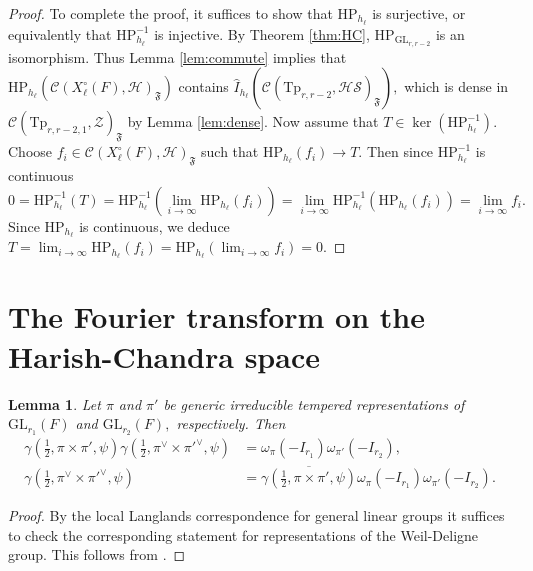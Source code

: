 \documentclass[12pt]{amsart}
\newtheorem{lem}[thm]{Lemma}
\theoremstyle{remark}
\numberwithin{equation}{section}
\newcommand{\GL}{\mathrm{GL}}
\theoremstyle{definition}
\numberwithin{equation}{subsection}
\begin{document}
\begin{proof}
To complete the proof, it suffices to show that $\mathrm{HP}_{h_\ell}$ is surjective, or equivalently that $\mathrm{HP}_{h_\ell}^{-1}$ is injective.  
By Theorem \ref{thm:HC}, $\mathrm{HP}_{\GL_{r,r-2}}$ is an isomorphism.  Thus Lemma \ref{lem:commute} implies that
$\mathrm{HP}_{h_\ell}(\mathcal{C}(X_{\ell}^\circ(F),\mathcal{H})_{\mathfrak{F}})$ contains $\widehat{I}_{h_\ell}(\mathcal{C}(\mathrm{Tp}_{r,r-2},\mathcal{HS})_{\mathfrak{F}}),$ which is dense in $\mathcal{C}(\mathrm{Tp}_{r,r-2,1},\mathcal{Z})_{\mathfrak{F}}$ by Lemma \ref{lem:dense}.
Now assume that $T \in \ker (\mathrm{HP}_{h_\ell}^{-1}).$
 Choose $f_i \in \mathcal{C}(X_{\ell}^\circ(F),\mathcal{H})_{\mathfrak{F}}$ such that $\mathrm{HP}_{h_\ell}(f_i) \to T.$  Then since $\mathrm{HP}_{h_\ell}^{-1}$ is continuous
 $$
 0=\mathrm{HP}_{h_\ell}^{-1}(T)= \mathrm{HP}_{h_\ell}^{-1} (\lim_{i\to\infty} \mathrm{HP}_{h_\ell}(f_i))=\lim_{i\to\infty} \mathrm{HP}_{h_\ell}^{-1} ( \mathrm{HP}_{h_\ell}(f_i))=\lim_{i\to\infty} f_i.
 $$
 Since $\mathrm{HP}_{h_\ell}$ is continuous, we deduce $T=\lim_{i\to\infty} \mathrm{HP}_{h_\ell}(f_i)= \mathrm{HP}_{h_\ell}(\lim_{i\to\infty} f_i)=0.$
\end{proof}






\section{The Fourier transform on the Harish-Chandra space}\label{sec:fourier}

\begin{lem} \label{lem:gamma:factors}
Let $\pi$ and $\pi'$ be generic irreducible tempered representations of $\GL_{r_1}(F)$ and $\GL_{r_2}(F),$ respectively.  Then 
\begin{align*}
\gamma(\tfrac{1}{2},\pi \times  \pi',\psi)\gamma(\tfrac{1}{2},\pi^\vee \times \pi'^\vee,\psi)&=\omega_{\pi}(-I_{r_1})\omega_{\pi'}(-I_{r_2}),\\
\gamma\left(\tfrac{1}{2},\pi^\vee \times \pi'^\vee,\psi \right)&=\overline{\gamma\left(\tfrac{1}{2},\pi \times \pi',\psi \right)}\omega_{\pi}(-I_{r_1})\omega_{\pi'}(-I_{r_2}).
\end{align*}
\end{lem}

\begin{proof}
By the local Langlands correspondence for general linear groups \cite{HT} it suffices to check the corresponding statement for representations of the Weil-Deligne group.  This follows from \cite[(3.6.8) and (3.6.9)]{Tate_NT}.
\end{proof}
 
\end{document}
